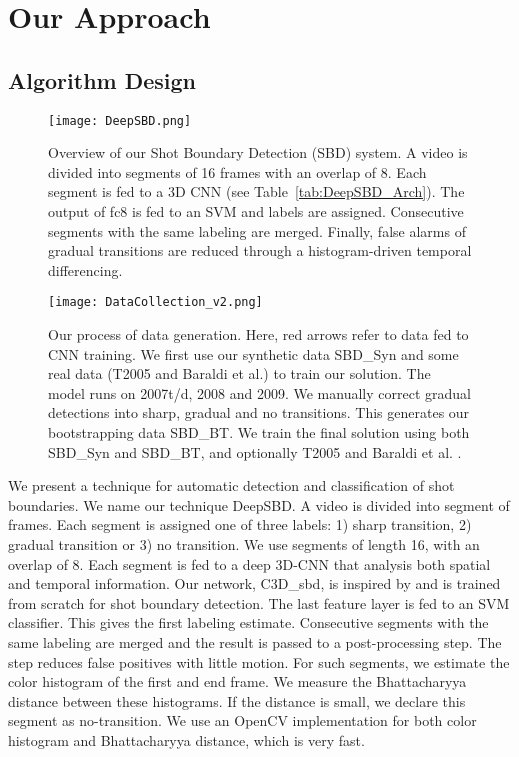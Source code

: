 \documentclass[journal]{IEEEtran}
\begin{document}
\section{Our Approach}



\subsection{Algorithm Design}

\begin{figure*}
  \centering
   \texttt{[image: DeepSBD.png]}
   \caption{Overview of our Shot Boundary Detection (SBD) system. A video is divided into segments of 16 frames with an overlap of 8. Each segment is fed to a 3D CNN (see Table~\ref{tab:DeepSBD_Arch}). The output of fc8 is fed to an SVM and labels are assigned. Consecutive segments with the same labeling are merged. Finally, false alarms of gradual transitions are reduced through a histogram-driven temporal differencing. }
\label{fig:DeepSBD}
 \end{figure*}

\begin{figure*}
  \centering
   \texttt{[image: DataCollection\_v2.png]}
   \caption{Our process of data generation. Here, red arrows refer to data fed to CNN training. We first use our synthetic data SBD\_Syn and some real data (T2005 and Baraldi et al.) to train our solution. The model runs on 2007t/d, 2008 and 2009. We manually correct gradual detections into sharp, gradual and no transitions. This generates our bootstrapping data SBD\_BT. We train the final solution using both SBD\_Syn and SBD\_BT, and optionally T2005 and Baraldi et al. .}
\label{fig:SBDData}
 \end{figure*}

We present a technique for automatic detection and classification of shot boundaries. We name our technique DeepSBD. A video is divided into segment of frames. Each segment is assigned one of three labels: 1) sharp transition, 2) gradual transition or 3) no transition. We use segments of length 16, with an overlap of 8. Each segment is fed to a deep 3D-CNN that analysis both spatial and temporal information. Our network, C3D\_{sbd}, is inspired by \cite{Tran15} and is trained from scratch for shot boundary detection. The last feature layer is fed to an SVM classifier. This gives the first labeling estimate. Consecutive segments with the same labeling are merged and the result is passed to a post-processing step. The step reduces false positives with little motion. For such segments, we estimate the color histogram of the first and end frame. We measure the Bhattacharyya distance between these histograms. If the distance is small, we declare this segment as no-transition. We use an OpenCV implementation for both color histogram and Bhattacharyya distance, which is very fast.
\end{document}
